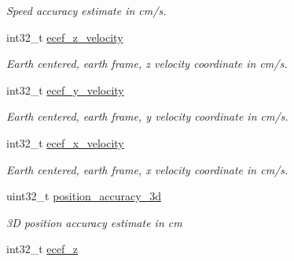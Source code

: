 \begin{DoxyCompactItemize}
\begin{DoxyCompactList}\small\item\em Speed accuracy estimate in cm/s. \end{DoxyCompactList}\item 
\hypertarget{structubx__nav__solution__t_a93cb5cec6c8c82ca7910b864d842874f}{int32\+\_\+t \hyperlink{structubx__nav__solution__t_a93cb5cec6c8c82ca7910b864d842874f}{ecef\+\_\+z\+\_\+velocity}}\label{structubx__nav__solution__t_a93cb5cec6c8c82ca7910b864d842874f}

\begin{DoxyCompactList}\small\item\em Earth centered, earth frame, z velocity coordinate in cm/s. \end{DoxyCompactList}\item 
\hypertarget{structubx__nav__solution__t_a94ef446ebf9e42acfac4bf73dabdcd80}{int32\+\_\+t \hyperlink{structubx__nav__solution__t_a94ef446ebf9e42acfac4bf73dabdcd80}{ecef\+\_\+y\+\_\+velocity}}\label{structubx__nav__solution__t_a94ef446ebf9e42acfac4bf73dabdcd80}

\begin{DoxyCompactList}\small\item\em Earth centered, earth frame, y velocity coordinate in cm/s. \end{DoxyCompactList}\item 
\hypertarget{structubx__nav__solution__t_a525b8fffbecf3e863e9343e50f02ffdf}{int32\+\_\+t \hyperlink{structubx__nav__solution__t_a525b8fffbecf3e863e9343e50f02ffdf}{ecef\+\_\+x\+\_\+velocity}}\label{structubx__nav__solution__t_a525b8fffbecf3e863e9343e50f02ffdf}

\begin{DoxyCompactList}\small\item\em Earth centered, earth frame, x velocity coordinate in cm/s. \end{DoxyCompactList}\item 
\hypertarget{structubx__nav__solution__t_aa8f22e1a1fd97eed7f372aa1cc87c3a0}{uint32\+\_\+t \hyperlink{structubx__nav__solution__t_aa8f22e1a1fd97eed7f372aa1cc87c3a0}{position\+\_\+accuracy\+\_\+3d}}\label{structubx__nav__solution__t_aa8f22e1a1fd97eed7f372aa1cc87c3a0}

\begin{DoxyCompactList}\small\item\em 3\+D position accuracy estimate in cm \end{DoxyCompactList}\item 
\hypertarget{structubx__nav__solution__t_a8c483649da8cb5e3dba2acf2f3d48f0f}{int32\+\_\+t \hyperlink{structubx__nav__solution__t_a8c483649da8cb5e3dba2acf2f3d48f0f}{ecef\+\_\+z}}\label{structubx__nav__solution__t_a8c483649da8cb5e3dba2acf2f3d48f0f}


\end{DoxyCompactItemize}
